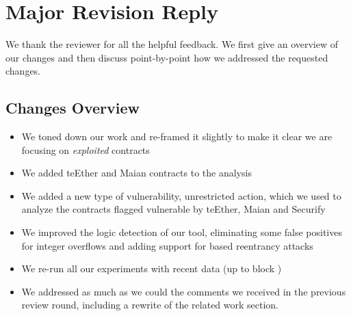 \newpage
\section{Major Revision Reply}
We thank the reviewer for all the helpful feedback.
We first give an overview of our changes and then discuss point-by-point how we addressed the requested changes.

\subsection{Changes Overview}
\begin{itemize}
  \setlength{\itemsep}{-2pt}
\item We toned down our work and re-framed it slightly to make it clear we are focusing on \emph{exploited} contracts
\item We added teEther and Maian contracts to the analysis
\item We added a new type of vulnerability, unrestricted action, which we used to analyze the contracts flagged vulnerable by teEther, Maian and Securify
\item We improved the logic detection of our tool, eliminating some false positives for integer overflows and adding support for  based reentrancy attacks
\item We re-run all our experiments with recent data (up to block )
\item We addressed as much as we could the comments we received in the previous review round, including a rewrite of the related work section.
\end{itemize}

